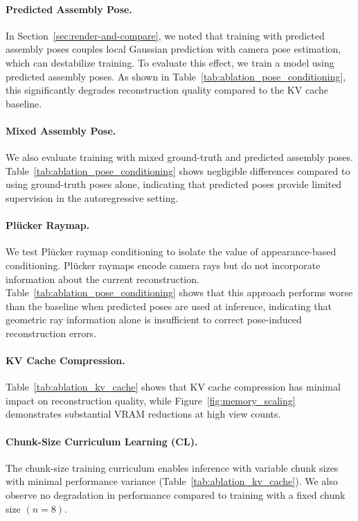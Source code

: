 \documentclass[runningheads]{llncs}
\begin{document}
\vspace{-2mm} \paragraph{\textbf{Predicted Assembly Pose.}}
In Section~\ref{sec:render-and-compare}, we noted that training with predicted assembly poses couples local Gaussian prediction with camera pose estimation, which can destabilize training.
To evaluate this effect, we train a model using predicted assembly poses.
As shown in Table~\ref{tab:ablation_pose_conditioning}, this significantly degrades reconstruction quality compared to the KV cache baseline.

\vspace{-2mm} \paragraph{\textbf{Mixed Assembly Pose.}}
We also evaluate training with mixed ground-truth and predicted assembly poses.
Table~\ref{tab:ablation_pose_conditioning} shows negligible differences compared to using ground-truth poses alone, indicating that predicted poses provide limited supervision in the autoregressive setting.

\vspace{-2mm} \paragraph{\textbf{Plücker Raymap.}}
We test Plücker raymap conditioning to isolate the value of appearance-based conditioning. 
Plücker raymaps encode camera rays but do not incorporate information about the current reconstruction. 
Table~\ref{tab:ablation_pose_conditioning} shows that this approach performs worse than the baseline when predicted poses are used at inference, indicating that geometric ray information alone is insufficient to correct pose-induced reconstruction errors.

\vspace{-2mm} \paragraph{\textbf{KV Cache Compression.}}
Table~\ref{tab:ablation_kv_cache} shows that KV cache compression has minimal impact on reconstruction quality, while Figure~\ref{fig:memory_scaling} demonstrates substantial VRAM reductions at high view counts.

\vspace{-2mm} \paragraph{\textbf{Chunk-Size Curriculum Learning (CL).}}
The chunk-size training curriculum enables inference with variable chunk sizes with minimal performance variance (Table~\ref{tab:ablation_kv_cache}).
We also observe no degradation in performance compared to training with a fixed chunk size $(n = 8)$.
\end{document}
